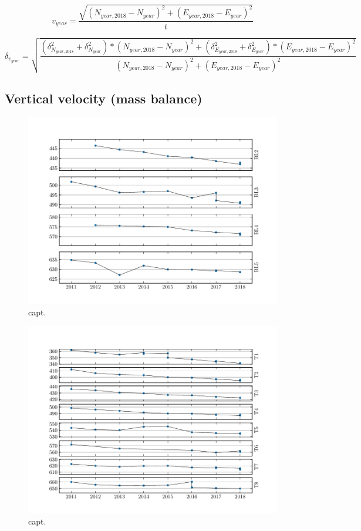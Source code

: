 \begin{equation}
\label{GPS:eq:v}
v_{year} = \frac{\sqrt{(N_{year, 2018}-N_{year})^2+(E_{year, 2018} - E_{year})^2}}{t}
\end{equation}

\begin{equation}
\label{GPS:eq:sv}
\delta_{v_{year}} = \sqrt{\frac{
(\delta_{N_{year, 2018}}^2 + \delta_{N_{year}}^2) * (N_{year, 2018}-N_{year})^2 +
(\delta_{E_{year, 2018}}^2 + \delta_{E_{year}}^2) * (E_{year, 2018}-E_{year})^2}
{(N_{year, 2018} - N_{year})^2+ (E_{year, 2018} - E_{year})^2}}
\end{equation}




\subsection{Vertical velocity (mass balance)}


\begin{figure}[H]
    \centering
    \includegraphics[width=\textwidth]{./figs/Elevation_Blekumbreen.pdf}
    \caption{capt.}
    \label{GPS:fig:elev_ble}
\end{figure}


\begin{figure}[H]
    \centering
    \includegraphics[width=\textwidth]{./figs/Elevation_Tellbreen.pdf}
    \caption{capt.}
    \label{GPS:fig:elev_tel}
\end{figure}